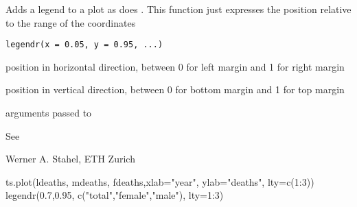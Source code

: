 \documentclass{article}
\begin{document}
\begin{Description}\relax
Adds a legend to a plot as does . This function
just expresses the position relative to the range of the coordinates
\end{Description}
\begin{Usage}
\begin{verbatim}
legendr(x = 0.05, y = 0.95, ...)
\end{verbatim}
\end{Usage}
\begin{Arguments}
\begin{ldescription}
\item[\code{x}] position in horizontal direction, between 0 for left margin
and 1 for right margin
\item[\code{y}] position in vertical direction, between 0 for bottom margin
and 1 for top margin
\item[\code{...}] arguments passed to 
\end{ldescription}
\end{Arguments}
\begin{Value}
See 
\end{Value}
\begin{Author}\relax
Werner A. Stahel, ETH Zurich
\end{Author}
\begin{SeeAlso}\relax
{}
\end{SeeAlso}
\begin{Examples}
\begin{ExampleCode}
     ts.plot(ldeaths, mdeaths, fdeaths,xlab="year", ylab="deaths", lty=c(1:3))
     legendr(0.7,0.95, c("total","female","male"), lty=1:3)
\end{ExampleCode}
\end{Examples}
\end{document}
